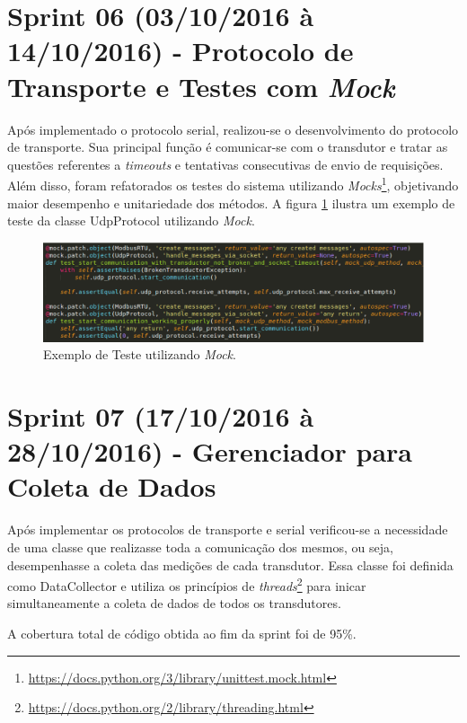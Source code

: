 \section{Sprint 06 (03/10/2016 à 14/10/2016) - Protocolo de Transporte e Testes com \textit{Mock}}
Após implementado o protocolo serial, realizou-se o desenvolvimento do protocolo de transporte. Sua principal função é comunicar-se com o transdutor e tratar as questões referentes a \textit{timeouts} e tentativas consecutivas de envio de requisições. Além disso, foram refatorados os testes do sistema utilizando \textit{Mocks}\footnote{\url{https://docs.python.org/3/library/unittest.mock.html}}, objetivando maior desempenho e unitariedade dos métodos. A figura \ref{exemplo_mock} ilustra um exemplo de teste da classe UdpProtocol utilizando \textit{Mock}.

\begin{figure}[!htpb]
    \centering
    \includegraphics[keepaspectratio=true,scale=0.5]{figuras/exemplo_mock.eps}
    \caption{Exemplo de Teste utilizando \textit{Mock}. }
    \label{exemplo_mock}
\end{figure}

\section{Sprint 07 (17/10/2016 à 28/10/2016) - Gerenciador para Coleta de Dados}
Após implementar os protocolos de transporte e serial verificou-se a necessidade de uma classe que realizasse toda a comunicação dos mesmos, ou seja, desempenhasse a coleta das medições de cada transdutor. Essa classe foi definida como DataCollector e utiliza os princípios de \textit{threads}\footnote{\url{https://docs.python.org/2/library/threading.html}} para inicar simultaneamente a coleta de dados de todos os transdutores.

A cobertura total de código obtida ao fim da sprint foi de 95\%.

